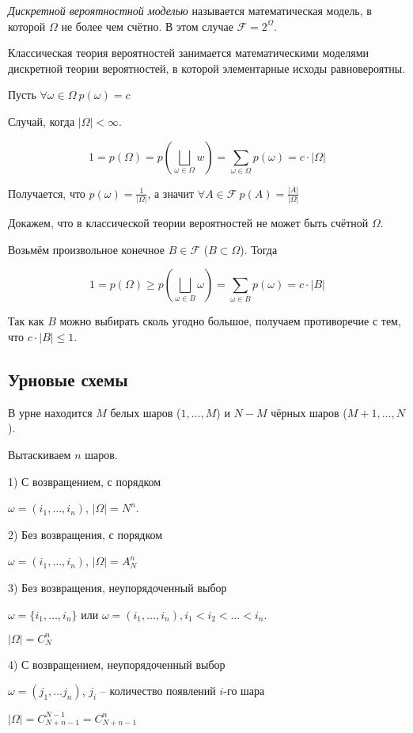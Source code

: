 \Def

\textit{Дискретной вероятностной моделью} называется математическая модель, в которой $\Omega$ не более чем счётно. В этом случае $\mathcal{F} = 2^{\Omega}$.

Классическая теория вероятностей занимается математическими моделями дискретной теории вероятностей, в которой элементарные исходы равновероятны.

Пусть $\forall \omega \in \Omega \ p(\omega) = c$

Случай, когда $|\Omega| < \infty$.

$$
1 = p(\Omega) = p(\bigsqcup_{\omega \in \Omega} w) = 
\sum_{\omega \in \Omega} p(\omega) = c \cdot |\Omega|
$$

Получается, что $p(\omega) = \frac{1}{|\Omega|}$, а значит
$\forall A \in \mathcal{F} \ p(A) = \frac{|A|}{|\Omega|}$

Докажем, что в классической теории вероятностей не может быть счётной $\Omega$.

Возьмём произвольное конечное $B \in \mathcal{F}$ ($B \subset \Omega$).
Тогда

$$
1 = p(\Omega) \geq p(\bigsqcup_{\omega \in B} \omega) = 
\sum_{\omega \in B} p(\omega) = c \cdot |B|
$$

Так как $B$ можно выбирать сколь угодно большое, получаем противоречие с тем, что $c \cdot |B| \leq 1$.

\subsection*{Урновые схемы}

В урне находится $M$ белых шаров ($1, \ldots, M$) 
и $N - M$ чёрных шаров ($M + 1, \ldots, N$).

Вытаскиваем $n$ шаров.

1) С возвращением, с порядком

$\omega = (i_1, \ldots, i_n)$, $|\Omega| = N^n$.

2) Без возвращения, с порядком

$\omega = (i_1, \ldots, i_n)$, $|\Omega| = A_N^n$

3) Без возвращения, неупорядоченный выбор

$\omega = \{ i_1, \ldots, i_n \}$ 
или $\omega = (i_1, \ldots, i_n), i_1 < i_2 < \ldots < i_n$.

$|\Omega| = C_N^n$

4) С возвращением, неупорядоченный выбор

$\omega = (j_1, \ldots j_n)$, $j_i$ -- количество появлений $i$-го шара

$|\Omega| = C_{N + n - 1}^{N - 1} = C_{N + n - 1}^{n}$

